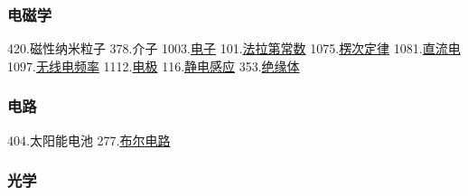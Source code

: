 \subsubsection{电磁学}
420.磁性纳米粒子
378.介子
1003.\href{https://wuli.wiki/assets/sogou/1003.\%E7\%94\%B5\%E5\%AD\%90\%20-\%20\%E6\%90\%9C\%E7\%8B\%97\%E7\%A7\%91\%E5\%AD\%A6\%E7\%99\%BE\%E7\%A7\%91.html}{电子}
101.\href{https://wuli.wiki/assets/sogou/101.\%E6\%B3\%95\%E6\%8B\%89\%E7\%AC\%AC\%E5\%B8\%B8\%E6\%95\%B0\%20-\%20\%E6\%90\%9C\%E7\%8B\%97\%E7\%A7\%91\%E5\%AD\%A6\%E7\%99\%BE\%E7\%A7\%91.html}{法拉第常数}
1075.\href{https://wuli.wiki/assets/sogou/1075.\%E6\%A5\%9E\%E6\%AC\%A1\%E5\%AE\%9A\%E5\%BE\%8B\%20-\%20\%E6\%90\%9C\%E7\%8B\%97\%E7\%A7\%91\%E5\%AD\%A6\%E7\%99\%BE\%E7\%A7\%91.html}{楞次定律}
1081.\href{https://wuli.wiki/assets/sogou/1081.\%E7\%9B\%B4\%E6\%B5\%81\%E7\%94\%B5\%20-\%20\%E6\%90\%9C\%E7\%8B\%97\%E7\%A7\%91\%E5\%AD\%A6\%E7\%99\%BE\%E7\%A7\%91.html}{直流电}
1097.\href{https://wuli.wiki/assets/sogou/1097.\%E6\%97\%A0\%E7\%BA\%BF\%E7\%94\%B5\%E9\%A2\%91\%E7\%8E\%87\%20-\%20\%E6\%90\%9C\%E7\%8B\%97\%E7\%A7\%91\%E5\%AD\%A6\%E7\%99\%BE\%E7\%A7\%91.html}{无线电频率}
1112.\href{https://wuli.wiki/assets/sogou/1112.\%E7\%94\%B5\%E6\%9E\%81\%20-\%20\%E6\%90\%9C\%E7\%8B\%97\%E7\%A7\%91\%E5\%AD\%A6\%E7\%99\%BE\%E7\%A7\%91.html}{电极}
116.\href{https://wuli.wiki/assets/sogou/116.\%E9\%9D\%99\%E7\%94\%B5\%E6\%84\%9F\%E5\%BA\%94\%20-\%20\%E6\%90\%9C\%E7\%8B\%97\%E7\%A7\%91\%E5\%AD\%A6\%E7\%99\%BE\%E7\%A7\%91.html}{静电感应}
353.\href{https://wuli.wiki/assets/sogou/353.\%E7\%BB\%9D\%E7\%BC\%98\%E4\%BD\%93\%20-\%20\%E6\%90\%9C\%E7\%8B\%97\%E7\%A7\%91\%E5\%AD\%A6\%E7\%99\%BE\%E7\%A7\%91.html}{绝缘体}
\subsubsection{电路}
404.太阳能电池
277.\href{https://wuli.wiki/assets/sogou/277.\%E5\%B8\%83\%E5\%B0\%94\%E7\%94\%B5\%E8\%B7\%AF\%20-\%20\%E6\%90\%9C\%E7\%8B\%97\%E7\%A7\%91\%E5\%AD\%A6\%E7\%99\%BE\%E7\%A7\%91.html}{布尔电路}
\subsubsection{光学}

